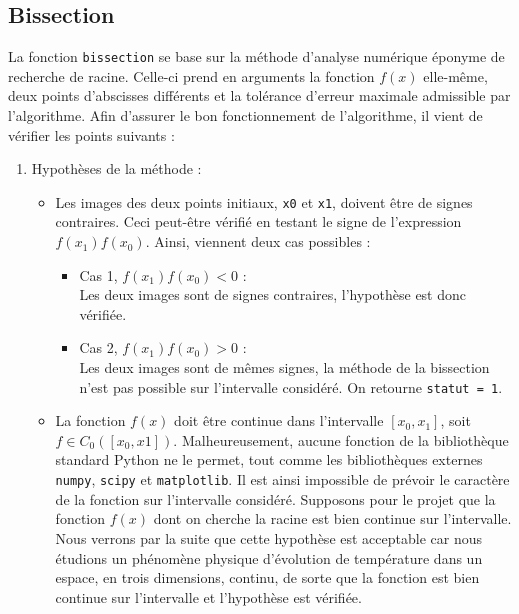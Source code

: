 \documentclass[12pt]{article}
\begin{document}
\subsection{Bissection}
    La fonction \texttt{bissection} se base sur la méthode d'analyse numérique éponyme de recherche de racine. Celle-ci prend en arguments la fonction $f(x)$ elle-même, deux points d'abscisses différents et la tolérance d'erreur maximale admissible par l'algorithme. Afin d'assurer le bon fonctionnement de l'algorithme, il vient de vérifier les points suivants :
\begin{enumerate}[label=\roman*.]
    \item Hypothèses de la méthode : 
        \begin{itemize}
            \item 
                Les images des deux points initiaux, \texttt{x0} et \texttt{x1}, doivent être de signes contraires. Ceci peut-être vérifié en testant le signe de l'expression $f(x_1)f(x_0)$. Ainsi, viennent deux cas possibles :
                
                \begin{itemize}
                    \item Cas 1, $f(x_1)f(x_0) < 0$ : \vspace{2mm} \\ 
                    Les deux images sont de signes contraires, l'hypothèse est donc vérifiée. \vspace{2mm} 
                    \item Cas 2, $f(x_1)f(x_0) > 0$ : \vspace{2mm} \\
                    Les deux images sont de mêmes signes, la méthode de la bissection n'est pas possible sur l'intervalle considéré. On retourne \texttt{statut = 1}.
                \end{itemize}
            \item
                La fonction $f(x)$ doit être continue dans l'intervalle $[x_0 , x_1]$, soit $f \in C_0([x_0,x1])$. Malheureusement, aucune fonction de la bibliothèque standard Python ne le permet, tout comme les bibliothèques externes \texttt{numpy}, \texttt{scipy} et \texttt{matplotlib}. Il est ainsi impossible de prévoir le caractère de la fonction sur l'intervalle considéré. Supposons pour le projet que la fonction $f(x)$ dont on cherche la racine est bien continue sur l'intervalle. Nous verrons par la suite que cette hypothèse est acceptable car nous étudions un phénomène physique d'évolution de température dans un espace, en trois dimensions, continu, de sorte que la fonction est bien continue sur l'intervalle et l'hypothèse est vérifiée.


\end{itemize}
\end{enumerate}
\end{document}
